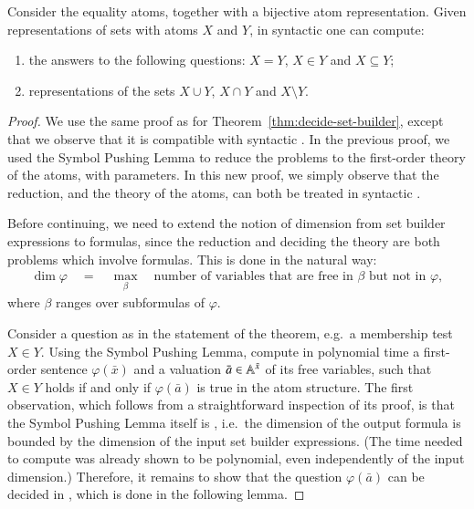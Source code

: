\begin{theorem}\label{thm:decide-set-builder-fdp}
	Consider the equality atoms, together with a bijective atom representation.     
    Given representations of  sets with atoms $X$ and $Y$, in syntactic \fdp one can compute:
	\begin{enumerate}
		\item the answers to the following questions: $X = Y$, $X \in Y$ and $X \subseteq Y$;
		\item representations of the sets $X \cup Y$, $X \cap Y$ and $X \setminus Y$.
	\end{enumerate}
\end{theorem}
\begin{proof}
We use the same proof as for Theorem~\ref{thm:decide-set-builder}, except that we observe that it is compatible with syntactic \fdp. In the previous proof, we used the Symbol Pushing Lemma to reduce the problems to the first-order theory of the atoms, with parameters. In this new proof, we simply observe that the  reduction, and the theory of the atoms, can both be treated in syntactic \fdp. 

Before continuing, we need to extend the notion of dimension from set builder expressions to formulas, since the reduction and deciding the theory are both problems which involve formulas.  This is done in the natural way: 
    \begin{align*}
    \dim \varphi \quad = \quad  \max_\beta \quad \text{number of variables that are free in $\beta$ but not in $\varphi$},
    \end{align*}
    where $\beta$ ranges over  subformulas of $\varphi$.

Consider a question as in the statement of the theorem, e.g.~a membership test $X \in Y$.   Using the  Symbol Pushing Lemma, compute in polynomial time a first-order sentence $\varphi(\bar x)$ and a valuation $\bar a \in \mathbb A^{\bar x}$ of its free variables, such that $X \in Y$ holds if and only if $\varphi(\bar a)$ is true in the atom structure.  The first observation, which follows from a straightforward inspection of its proof, is that the Symbol Pushing Lemma itself is \fdp, i.e.~the dimension of the output formula is bounded by the dimension of the input set builder expressions. (The time needed to compute was already shown to be polynomial, even independently of the input dimension.) Therefore, it remains to show that the question $\varphi(\bar a)$ can be decided in \fdp, which is done in the following lemma.



\end{proof}
